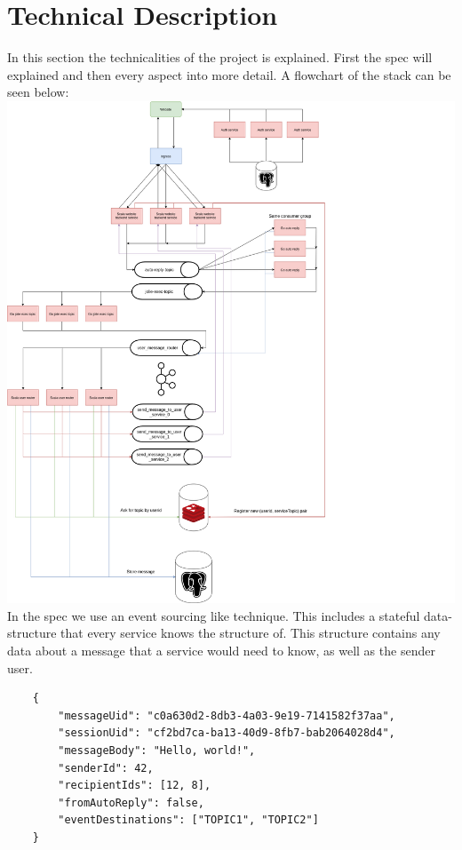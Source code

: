
\section{Technical Description}\label{sec:technicalDescription}
In this section the technicalities of the project is explained.
First the spec will explained and then every aspect into more detail.
A flowchart of the stack can be seen below:\\
\includegraphics[scale=0.38]{stack.png}
\\
In the spec we use an event sourcing like technique.
This includes a stateful data-structure that every service knows the structure of.
This structure contains any data about a message that a service would need to know, as well as the sender user.\\
\begin{lstlisting}
    {
        "messageUid": "c0a630d2-8db3-4a03-9e19-7141582f37aa",
        "sessionUid": "cf2bd7ca-ba13-40d9-8fb7-bab2064028d4",
        "messageBody": "Hello, world!",
        "senderId": 42,
        "recipientIds": [12, 8],
        "fromAutoReply": false,
        "eventDestinations": ["TOPIC1", "TOPIC2"]
    }
\end{lstlisting}
